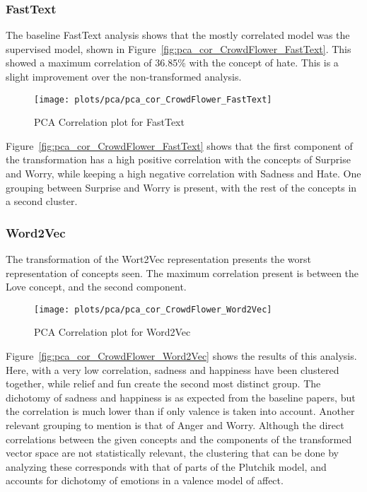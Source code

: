\subsubsection{FastText}
The baseline FastText analysis shows that the mostly correlated model was the supervised model, shown in Figure~\ref{fig:pca_cor_CrowdFlower_FastText}. This showed a maximum correlation of 36.85\% with the concept of hate. This is a slight improvement over the non-transformed analysis.
\begin{figure}[H]
  \texttt{[image: plots/pca/pca\_cor\_CrowdFlower\_FastText]}
  \centering
  \caption{PCA Correlation plot for FastText}
\end{figure}\label{fig:pca_cor_CrowdFlower_FastText}
Figure~\ref{fig:pca_cor_CrowdFlower_FastText} shows that the first component of the transformation has a high positive correlation with the concepts of Surprise and Worry, while keeping a high negative correlation with Sadness and Hate. One grouping between Surprise and Worry is present, with the rest of the concepts in a second cluster.

\subsubsection{Word2Vec}
The transformation of the Wort2Vec representation presents the worst representation of concepts seen. The maximum correlation present is between the Love concept, and the second component.
\begin{figure}[H]
  \texttt{[image: plots/pca/pca\_cor\_CrowdFlower\_Word2Vec]}
  \centering
  \caption{PCA Correlation plot for Word2Vec}
\end{figure}\label{fig:pca_cor_CrowdFlower_Word2Vec}
Figure~\ref{fig:pca_cor_CrowdFlower_Word2Vec} shows the results of this analysis. Here, with a very low correlation, sadness and happiness have been clustered together, while relief and fun create the second most distinct group. The dichotomy of sadness and happiness is as expected from the baseline papers, but the correlation is much lower than if only valence is taken into account.
Another relevant grouping to mention is that of Anger and Worry. Although the direct correlations between the given concepts and the components of the transformed vector space are not statistically relevant, the clustering that can be done by analyzing these corresponds with that of parts of the Plutchik model, and accounts for dichotomy of emotions in a valence model of affect.


